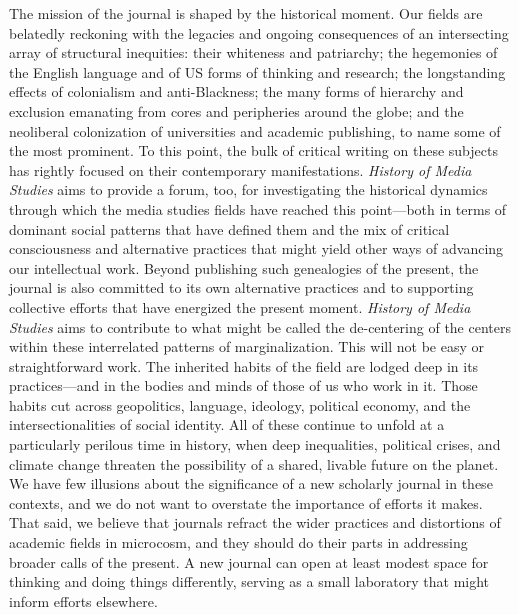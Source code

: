 \documentclass{tufte-handout}
\begin{document}
The mission of the journal is shaped by the historical moment. Our
fields are belatedly reckoning with the legacies and ongoing
consequences of an intersecting array of structural inequities: their
whiteness and patriarchy; the hegemonies of the English language and of
US forms of thinking and research; the longstanding effects of
colonialism and anti-Blackness; the many forms of hierarchy and
exclusion emanating from cores and peripheries around the globe; and the
neoliberal colonization of universities and academic publishing, to name
some of the most prominent. To this point, the bulk of critical writing
on these subjects has rightly focused on their contemporary
manifestations. \emph{History of Media Studies} aims to provide a forum,
too, for investigating the historical dynamics through which the media
studies fields have reached this point---both in terms of dominant
social patterns that have defined them and the mix of critical
consciousness and alternative practices that might yield other ways of
advancing our intellectual work. Beyond publishing such genealogies of
the present, the journal is also committed to its own alternative
practices and to supporting collective efforts that have energized the
present moment.
\newpage
\emph{History of Media Studies} aims to contribute to what might be
called the de-centering of the centers within these interrelated
patterns of marginalization. This will not be easy or straightforward
work. The inherited habits of the field are lodged deep in its
practices---and in the bodies and minds of those of us who work in it.
Those habits cut across geopolitics, language, ideology, political
economy, and the intersectionalities of social identity. All of these
continue to unfold at a particularly perilous time in history, when deep
inequalities, political crises, and climate change threaten the
possibility of a shared, livable future on the planet. We have few
illusions about the significance of a new scholarly journal in these
contexts, and we do not want to overstate the importance of efforts it
makes. That said, we believe that journals refract the wider practices
and distortions of academic fields in microcosm, and they should do
their parts in addressing broader calls of the present. A new journal
can open at least modest space for thinking and doing things
differently, serving as a small laboratory that might inform efforts
elsewhere.
\end{document}
